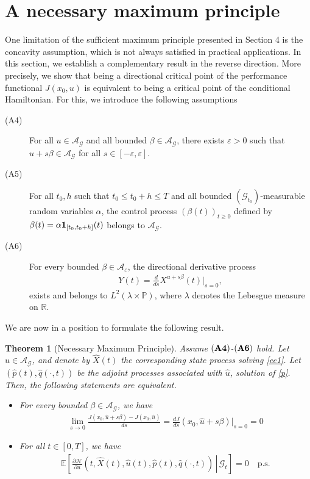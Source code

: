 \documentclass[12pt]{article}
\newtheorem{theorem}{Theorem}[section]
\theoremstyle{remark}
\numberwithin{equation}{section}
\def\R{\mathbb R}
\begin{document}
\section{A necessary maximum principle}\label{sec:necessary}
One limitation of the sufficient maximum principle presented in Section 4 is the concavity assumption, which is not always satisfied in practical applications. In this section, we establish a complementary result in the reverse direction. More precisely, we show that being a directional critical point of the performance functional $J(x_{0},u)$ is equivalent to being a critical point of the conditional Hamiltonian. For this, we introduce the following assumptions
\begin{description}
\item[(A4)] For all $u \in \mathcal{A}_{\mathcal{G}}$ and all bounded $\beta \in \mathcal{A}_{\mathcal{G}}$, there exists $\varepsilon>0$ such that $u+s\beta\in\mathcal{A}_{\mathcal{G}}$ for all $s\in[-\varepsilon,\varepsilon]$.
\item[(A5)] For all  $t_0, h$ such that $t_0\leq t_0+h\leq T$  and all bounded $(\mathcal{G}_{t_0})$-measurable random variables $\alpha$, the control process $(\beta(t))_{t\geq 0}$ defined by $\beta(t)=\alpha {\bf 1}_{[t_0, t_0+h]}(t)$ belongs to $\mathcal{A}_{\mathcal{G}}$.
\item[(A6)] For every bounded $\beta\in\mathcal{A}_{\varepsilon}$, the directional derivative process 
\begin{eqnarray}\label{Ep02}
Y(t)=\frac{d}{ds}X^{u+s\beta}(t)|_{s=0},
\end{eqnarray} 
exists and belongs to $L^{2}(\lambda \times \mathbb{P})$, where $\lambda$ denotes the Lebesgue measure on $\R$.
\end{description}
We are now in a position to formulate the following result.
\begin{theorem}[Necessary Maximum Principle]
Assume $({\bf A4)}$-$({\bf A6})$ hold. Let $\hat{u} \in \mathcal{A}_{\mathcal{G}}$, and denote by $\hat{X}(t)$  the corresponding state process solving \eqref{ee1}. Let $(\hat{p}(t), \hat{q}(\cdot,t))$ be the adjoint processes associated with $\hat{u}$, solution of \eqref{p}. Then, the following statements are equivalent.
\begin{itemize}
\item[(i)] For every bounded $\beta\in \mathcal{A}_{\mathcal{G}}$, we have
\begin{eqnarray*}
\lim_{s \to 0}\frac{J(x_{0},\hat{u}+s\beta)-J(x_{0},\hat{u})}{ds} =\frac{dJ}{ds}(x_0,\hat{u}+s\beta)|_{s=0}= 0
\end{eqnarray*}
\item[(ii)] For all $t \in [0,T]$, we have
\begin{eqnarray*}
\mathbb{E} \left[ \left. \frac{\partial \mathcal{H}}{\partial u} \left(t,\hat{X}(t), \hat{u}(t), \hat{p}(t), \hat{q}(\cdot,t) \right) \, \right| \, \mathcal{G}_t \right]= 0 \quad \text{p.s.}		
\end{eqnarray*}
\end{itemize}
\end{theorem}
\end{document}
